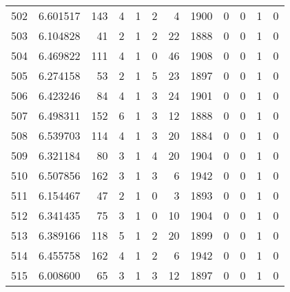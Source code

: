 \begin{tabular}{lrrrrrrrrrrr}
502 &  6.601517 &  143 &      4 &        1 &      2 &               4 &  1900 &               0 &               0 &               1 &               0 \\
503 &  6.104828 &   41 &      2 &        1 &      2 &              22 &  1888 &               0 &               0 &               1 &               0 \\
504 &  6.469822 &  111 &      4 &        1 &      0 &              46 &  1908 &               0 &               0 &               1 &               0 \\
505 &  6.274158 &   53 &      2 &        1 &      5 &              23 &  1897 &               0 &               0 &               1 &               0 \\
506 &  6.423246 &   84 &      4 &        1 &      3 &              24 &  1901 &               0 &               0 &               1 &               0 \\
507 &  6.498311 &  152 &      6 &        1 &      3 &              12 &  1888 &               0 &               0 &               1 &               0 \\
508 &  6.539703 &  114 &      4 &        1 &      3 &              20 &  1884 &               0 &               0 &               1 &               0 \\
509 &  6.321184 &   80 &      3 &        1 &      4 &              20 &  1904 &               0 &               0 &               1 &               0 \\
510 &  6.507856 &  162 &      3 &        1 &      3 &               6 &  1942 &               0 &               0 &               1 &               0 \\
511 &  6.154467 &   47 &      2 &        1 &      0 &               3 &  1893 &               0 &               0 &               1 &               0 \\
512 &  6.341435 &   75 &      3 &        1 &      0 &              10 &  1904 &               0 &               0 &               1 &               0 \\
513 &  6.389166 &  118 &      5 &        1 &      2 &              20 &  1899 &               0 &               0 &               1 &               0 \\
514 &  6.455758 &  162 &      4 &        1 &      2 &               6 &  1942 &               0 &               0 &               1 &               0 \\
515 &  6.008600 &   65 &      3 &        1 &      3 &              12 &  1897 &               0 &               0 &               1 &               0 \\

\end{tabular}
